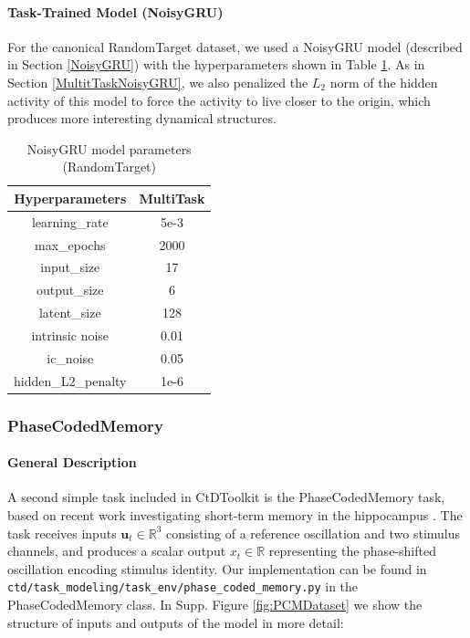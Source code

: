 \documentclass{article}
\begin{document}
\paragraph{Task-Trained Model (NoisyGRU)}
For the canonical RandomTarget dataset, we used a NoisyGRU model (described in Section \ref{NoisyGRU}) with the hyperparameters shown in Table \ref{table:RandomTargetGRU}. As in Section \ref{MultitTaskNoisyGRU}, we also penalized the $L_2$ norm of the hidden activity of this model to force the activity to live closer to the origin, which produces more interesting dynamical structures.

\begin{table}[ht]
\centering
\begin{tabular}{|c|c|}
\hline
\textbf{Hyperparameters} & \textbf{MultiTask} \\ \hline
learning\_rate &  5e-3  \\ \hline
max\_epochs &  2000  \\ \hline
input\_size & 17 \\ \hline
output\_size & 6 \\ \hline
latent\_size & 128 \\ \hline
intrinsic noise &  0.01 \\ \hline
ic\_noise & 0.05  \\ \hline
hidden\_L2\_penalty & 1e-6 \\ \hline
\end{tabular}
\caption{NoisyGRU model parameters (RandomTarget)}
\label{table:RandomTargetGRU}
\end{table}


\clearpage
\subsubsection{PhaseCodedMemory \label{appendix:TT-TaskEnvs-PCM}}
\paragraph{General Description}
A second simple task included in CtDToolkit is the PhaseCodedMemory task, based on recent work investigating short-term memory in the hippocampus \cite{Pals2024-co}. The task receives inputs $\mathbf{u}_t \in \mathbb{R}^3$ consisting of a reference oscillation and two stimulus channels, and produces a scalar output $x_t \in \mathbb{R}$ representing the phase-shifted oscillation encoding stimulus identity. Our implementation can be found in \texttt{ctd/task\_modeling/task\_env/phase\_coded\_memory.py} in the PhaseCodedMemory class. In Supp. Figure \ref{fig:PCMDataset} we show the structure of inputs and outputs of the model in more detail:
\end{document}

